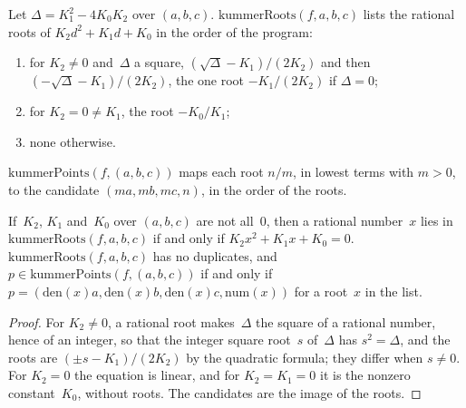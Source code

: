 \begin{definition}\label{def:kummerRoots}
  \leanok
  Let $\Delta = K_1^2 - 4 K_0 K_2$ over $(a, b, c)$. $\mathrm{kummerRoots}(f, a, b, c)$ lists the
  rational roots of $K_2 d^2 + K_1 d + K_0$ in the order of the program:
  \begin{enumerate}
    \item for $K_2 \ne 0$ and~$\Delta$ a square, $(\sqrt{\Delta} - K_1)/(2 K_2)$ and then
      $(-\sqrt{\Delta} - K_1)/(2 K_2)$, the one root $-K_1/(2 K_2)$ if $\Delta = 0$;
    \item for $K_2 = 0 \ne K_1$, the root $-K_0/K_1$;
    \item none otherwise.
  \end{enumerate}
  $\mathrm{kummerPoints}(f, (a, b, c))$ maps each root $n/m$, in lowest terms with $m > 0$, to the
  candidate $(m a, m b, m c, n)$, in the order of the roots.
\end{definition}

\begin{lemma}\label{lem:mem_kummerRoots_iff}
  \leanok
  If~$K_2$, $K_1$ and~$K_0$ over $(a, b, c)$ are not all~$0$, then a rational number~$x$ lies in
  $\mathrm{kummerRoots}(f, a, b, c)$ if and only if $K_2 x^2 + K_1 x + K_0 = 0$.
  $\mathrm{kummerRoots}(f, a, b, c)$ has no duplicates, and
  $p \in \mathrm{kummerPoints}(f, (a, b, c))$ if and only if
  $p = (\mathrm{den}(x) a, \mathrm{den}(x) b, \mathrm{den}(x) c, \mathrm{num}(x))$ for a root~$x$
  in the list.
\end{lemma}

\begin{proof}\leanok
  For $K_2 \ne 0$, a rational root makes~$\Delta$ the square of a rational number, hence of an
  integer, so that the integer square root~$s$ of~$\Delta$ has $s^2 = \Delta$, and the roots are
  $(\pm s - K_1)/(2 K_2)$ by the quadratic formula; they differ when $s \ne 0$. For $K_2 = 0$ the
  equation is linear, and for $K_2 = K_1 = 0$ it is the nonzero constant~$K_0$, without roots. The
  candidates are the image of the roots.
\end{proof}


